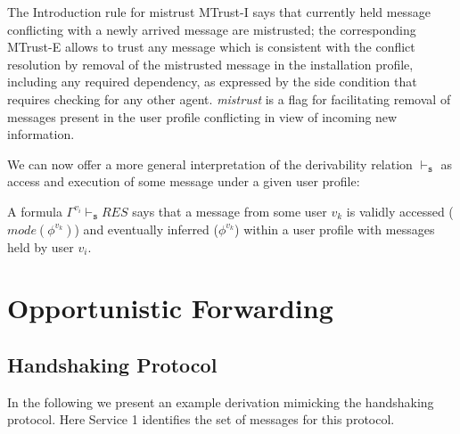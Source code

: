 \documentclass[]{llncs}
\begin{document}
The Introduction rule for mistrust MTrust-I says that currently held message conflicting with a newly arrived message are mistrusted; the corresponding MTrust-E allows to trust any message which is consistent with the conflict resolution by removal of the mistrusted message in the installation profile, including any required dependency, as expressed by the side condition that requires checking for any other agent. 
\textit{mistrust} is a flag for facilitating removal of messages present in the user profile conflicting in view of incoming new information. 



We can now offer a more general interpretation of the derivability relation $\vdash_{\mathtt{s}} $ as access and execution of some message under a given user profile:
%
\begin{definition}
	A formula $\Gamma^{v_{i}} \vdash_{\mathtt{s}}  RES$ says that a message from some user $v_{k}$ is validly accessed ($mode(\phi^{v_{k}})$) and eventually inferred ($\phi^{v_{k}}$) within a user profile with messages held by user $v_{i}$. 
\end{definition}



\section{Opportunistic Forwarding}

\subsection{Handshaking Protocol}

In the following we present an example derivation mimicking the handshaking protocol. Here Service 1 identifies the set of messages for this protocol.
\end{document}
